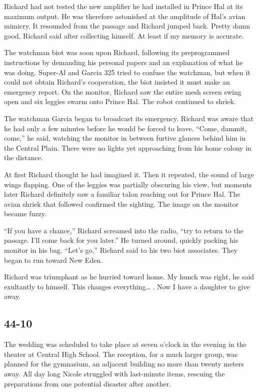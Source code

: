 \documentclass[]{article}
\begin{document}
{Richard had not tested the new amplifier he had installed in Prince Hal at its maximum output. He was therefore astonished at the amplitude of Hal’s avian mimicry. It resounded from the passage and Richard jumped back. Pretty damn good, Richard said after collecting himself. At least if my memory is accurate.

The watchman biot was soon upon Richard, following its preprogrammed instructions by demanding his personal papers and an explanation of what he was doing. Super-Al and Garcia 325 tried to confuse the watchman, but when it could not obtain Richard’s cooperation, the biot insisted it must make an emergency report. On the monitor, Richard saw the entire mesh screen swing open and six leggies swarm onto Prince Hal. The robot continued to shriek.

The watchman Garcia began to broadcast its emergency. Richard was aware that he had only a few minutes before he would be forced to leave. “Come, dammit, come,” he said, watching the monitor in between furtive glances behind him in the Central Plain. There were no lights yet approaching from his home colony in the distance.

At first Richard thought he had imagined it. Then it repeated, the sound of large wings flapping. One of the leggies was partially obscuring his view, but moments later Richard definitely saw a familiar talon reaching out for Prince Hal. The avian shriek that followed confirmed the sighting. The image on the monitor became fuzzy.

“If you have a chance,” Richard screamed into the radio, “try to return to the passage. I’ll come back for you later.” He turned around, quickly packing his monitor in his bag. “Let’s go,” Richard said to his two biot associates. They began to run toward New Eden.

Richard was triumphant as he hurried toward home. My hunch was right, he said exultantly to himself. This changes everything… . Now I have a daughter to give away.


\subsection{44-10}

The wedding was scheduled to take place at seven o’clock in the evening in the theater at Central High School. The reception, for a much larger group, was planned for the gymnasium, an adjacent building no more than twenty meters away. All day long Nicole struggled with last-minute items, rescuing the preparations from one potential disaster after another.

}
\end{document}
